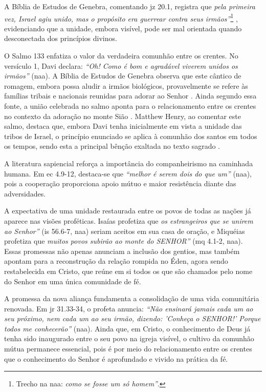 A Bíblia de Estudos de Genebra, comentando \gls{jz} 20.1, registra que \textit{pela primeira vez, Israel agiu unido, mas o propósito era guerrear contra seus irmãos''}\footnote{Trecho na \gls{naa}: \textit{como se fosse um só homem''}.} \cite[p.~443]{bibliaGenebra}, evidenciando que a unidade, embora visível, pode ser mal orientada quando desconectada dos princípios divinos.

O Salmo 133 enfatiza o valor da verdadeira comunhão entre os crentes. No versículo 1, Davi declara: \textit{``Oh! Como é bom e agradável viverem unidos os irmãos''} (\gls{naa}). A Bíblia de Estudos de Genebra observa que este cântico de romagem, embora possa aludir a irmãos biológicos, provavelmente se refere às famílias tribais e nacionais reunidas para adorar ao Senhor \cite[p.~1053]{bibliaGenebra}. Ainda segundo essa fonte, a união celebrada no salmo aponta para o relacionamento entre os crentes no contexto da adoração no monte Sião \cite[p.~1053]{bibliaGenebra}. Matthew Henry, ao comentar este salmo, destaca que, embora Davi tenha inicialmente em vista a unidade das tribos de Israel, o princípio enunciado se aplica à comunhão dos santos em todos os tempos, sendo esta a principal bênção exaltada no texto sagrado \cite[p.~1077]{mathewHenry}.

A literatura sapiencial reforça a importância do companheirismo na caminhada humana. Em \gls{ec} 4.9-12, destaca-se que \textit{``melhor é serem dois do que um''} (\gls{naa}), pois a cooperação proporciona apoio mútuo e maior resistência diante das adversidades.

A expectativa de uma unidade restaurada entre os povos de todas as nações já aparece nas visões proféticas. Isaías profetiza que \textit{os estrangeiros que se unirem ao Senhor''} (\gls{is} 56.6-7, \gls{naa}) seriam aceitos em sua casa de oração, e Miquéias profetiza que \textit{muitos povos subirão ao monte do SENHOR''} (\gls{mq} 4.1-2, \gls{naa}). Essas promessas não apenas anunciam a inclusão dos gentios, mas também apontam para a reconstrução da relação rompida no Éden, agora sendo restabelecida em Cristo, que reúne em si todos os que são chamados pelo nome do Senhor em uma única comunidade de fé.

A promessa da nova aliança fundamenta a consolidação de uma vida comunitária renovada. Em \gls{jr} 31.33-34, o profeta anuncia: \textit{``Não ensinará jamais cada um ao seu próximo, nem cada um ao seu irmão, dizendo: 'Conheça o SENHOR!' Porque todos me conhecerão''} (\gls{naa}). Ainda que, em Cristo, o conhecimento de Deus já tenha sido inaugurado entre o seu povo na igreja visível, o cultivo da comunhão mútua permanece essencial, pois é por meio do relacionamento entre os crentes que o conhecimento do Senhor é aprofundado e vivido na prática da fé.

